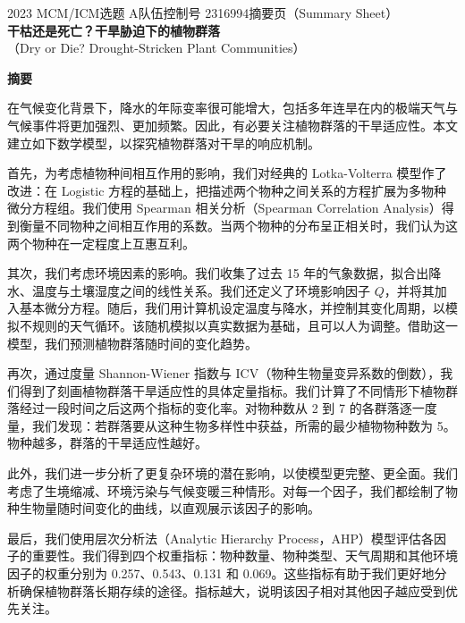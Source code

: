 \documentclass[11pt,a4paper]{ctexart}
\begin{document}
\thispagestyle{empty}
\begin{center}
{\small 2023 MCM/ICM\quad 选题 A\quad 队伍控制号 2316994\quad 摘要页（Summary Sheet）}\\[18pt]
{\LARGE\bfseries 干枯还是死亡？干旱胁迫下的植物群落}\\[8pt]
{\large （Dry or Die? Drought-Stricken Plant Communities）}\\[10pt]
\end{center}

\begin{center}
{\large\bfseries 摘\quad 要}
\end{center}

\vspace{6pt}
在气候变化背景下，降水的年际变率很可能增大，包括多年连旱在内的极端天气与气候事件将更加强烈、更加频繁。因此，有必要关注植物群落的干旱适应性。本文建立如下数学模型，以探究植物群落对干旱的响应机制。

首先，为考虑植物种间相互作用的影响，我们对经典的 Lotka-Volterra 模型作了改进：在 Logistic 方程的基础上，把描述两个物种之间关系的方程扩展为多物种微分方程组。我们使用 Spearman 相关分析（Spearman Correlation Analysis）得到衡量不同物种之间相互作用的系数。当两个物种的分布呈正相关时，我们认为这两个物种在一定程度上互惠互利。

其次，我们考虑环境因素的影响。我们收集了过去 15 年的气象数据，拟合出降水、温度与土壤湿度之间的线性关系。我们还定义了环境影响因子 $Q$，并将其加入基本微分方程。随后，我们用计算机设定温度与降水，并控制其变化周期，以模拟不规则的天气循环。该随机模拟以真实数据为基础，且可以人为调整。借助这一模型，我们预测植物群落随时间的变化趋势。

再次，通过度量 Shannon-Wiener 指数与 ICV（物种生物量变异系数的倒数），我们得到了刻画植物群落干旱适应性的具体定量指标。我们计算了不同情形下植物群落经过一段时间之后这两个指标的变化率。对物种数从 2 到 7 的各群落逐一度量，我们发现：若群落要从这种生物多样性中获益，所需的最少植物物种数为 5。物种越多，群落的干旱适应性越好。

此外，我们进一步分析了更复杂环境的潜在影响，以使模型更完整、更全面。我们考虑了生境缩减、环境污染与气候变暖三种情形。对每一个因子，我们都绘制了物种生物量随时间变化的曲线，以直观展示该因子的影响。

最后，我们使用层次分析法（Analytic Hierarchy Process，AHP）模型评估各因子的重要性。我们得到四个权重指标：物种数量、物种类型、天气周期和其他环境因子的权重分别为 0.257、0.543、0.131 和 0.069。这些指标有助于我们更好地分析确保植物群落长期存续的途径。指标越大，说明该因子相对其他因子越应受到优先关注。
\end{document}
